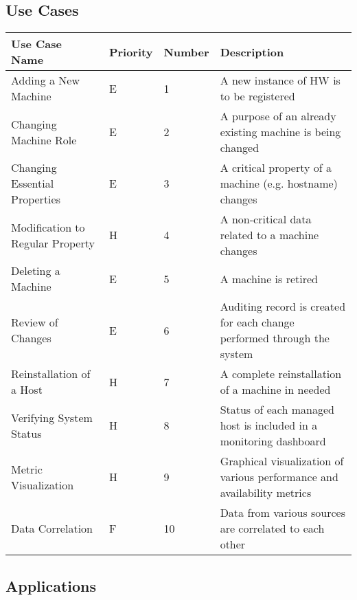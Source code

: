 \documentclass[12pt]{article}
\begin{document}
\subsection{Use Cases}

\begin{center}
	\begin{tabular}{| p{4cm} | p{1.5cm} | p{1.5cm} | p{7cm} |}
		\hline
		\textbf{Use Case Name} & \textbf{Priority} & \textbf{Number} & \textbf{Description}\\
        \hline
        Adding a New Machine & E & 1 & A new instance of HW is to be registered\\
        \hline
        Changing Machine Role & E & 2 & A purpose of an already existing machine is being changed\\
        \hline
        Changing Essential Properties & E & 3 & A critical property of a machine (e.g. hostname) changes\\
        \hline
        Modification to Regular Property & H & 4 & A non-critical data related to a machine changes\\
        \hline
        Deleting a Machine & E & 5 & A machine is retired\\
        \hline
        Review of Changes & E & 6 & Auditing record is created for each change performed through the system\\
        \hline
        Reinstallation of a Host & H & 7 & A complete reinstallation of a machine in needed\\
        \hline
        Verifying System Status & H & 8 & Status of each managed host is included in a monitoring dashboard\\
        \hline
        Metric Visualization & H & 9 & Graphical visualization of various performance and availability metrics\\
		\hline
        Data Correlation & F & 10 & Data from various sources are correlated to each other\\
        \hline
	\end{tabular}
	\label{tab:UseCases}
\end{center}

\subsection{Applications}
\end{document}
